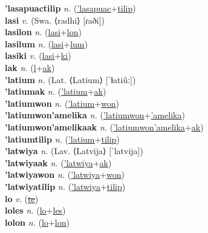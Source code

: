 \textbf{'lasapuactilip} \textit{n.} (\hyperref['lasapuac]{'lasapuac}+\hyperref[tilip]{tilip})
 \label{'lasapuactilip} \\
\textbf{lasi} \textit{v.} (Swa. ⟨radhi⟩ [ɾaði])
 \label{lasi} \\
\textbf{lasilon} \textit{n.} (\hyperref[lasi]{lasi}+\hyperref[lon]{lon})
 \label{lasilon} \\
\textbf{lasilum} \textit{n.} (\hyperref[lasi]{lasi}+\hyperref[lum]{lum})
 \label{lasilum} \\
\textbf{lasiki} \textit{v.} (\hyperref[lasi]{lasi}+\hyperref[ki]{ki})
 \label{lasiki} \\
\textbf{lak} \textit{n.} (\hyperref[l]{l}+\hyperref[ak]{ak})
 \label{lak} \\
\textbf{'latium} \textit{n.} (Lat. ⟨Latium⟩ [ˈɫatiũː])
 \label{'latium} \\
\textbf{'latiumak} \textit{n.} (\hyperref['latium]{'latium}+\hyperref[ak]{ak})
 \label{'latiumak} \\
\textbf{'latiumwon} \textit{n.} (\hyperref['latium]{'latium}+\hyperref[won]{won})
 \label{'latiumwon} \\
\textbf{'latiumwon'amelika} \textit{n.} (\hyperref['latiumwon]{'latiumwon}+\hyperref['amelika]{'amelika})
 \label{'latiumwon'amelika} \\
\textbf{'latiumwon'amelikaak} \textit{n.} (\hyperref['latiumwon'amelika]{'latiumwon'amelika}+\hyperref[ak]{ak})
 \label{'latiumwon'amelikaak} \\
\textbf{'latiumtilip} \textit{n.} (\hyperref['latium]{'latium}+\hyperref[tilip]{tilip})
 \label{'latiumtilip} \\
\textbf{'latwiya} \textit{n.} (Lav. ⟨Latvija⟩ [ˈlatvija])
 \label{'latwiya} \\
\textbf{'latwiyaak} \textit{n.} (\hyperref['latwiya]{'latwiya}+\hyperref[ak]{ak})
 \label{'latwiyaak} \\
\textbf{'latwiyawon} \textit{n.} (\hyperref['latwiya]{'latwiya}+\hyperref[won]{won})
 \label{'latwiyawon} \\
\textbf{'latwiyatilip} \textit{n.} (\hyperref['latwiya]{'latwiya}+\hyperref[tilip]{tilip})
 \label{'latwiyatilip} \\
\textbf{lo} \textit{v.} (\hyperref[te]{\sout{te}})
 \label{lo} \\
\textbf{loles} \textit{n.} (\hyperref[lo]{lo}+\hyperref[les]{les})
 \label{loles} \\
\textbf{lolon} \textit{n.} (\hyperref[lo]{lo}+\hyperref[lon]{lon})
 \label{lolon} \\
